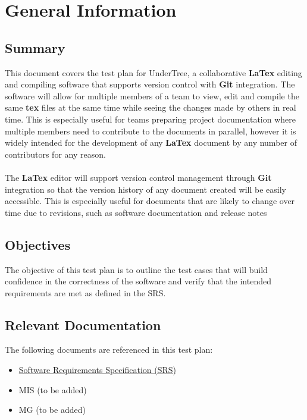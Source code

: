 \documentclass[12pt, titlepage]{article}
\begin{document}
	\section{General Information}
	
	\subsection{Summary}
	
	This document covers the test plan for UnderTree, a collaborative \textbf{LaTex} editing and compiling software that supports version control with\textbf{ Git }integration. The software will allow for multiple members of a team to view, edit and compile the same \textbf{tex} files at the same time while seeing the changes made by others in real time. This is especially useful for teams preparing project documentation where multiple members need to contribute to the documents in parallel, however it is widely intended for the development of any \textbf{LaTex} document by any number of contributors for any reason.\\
	\\The \textbf{LaTex} editor will support version control management through\textbf{ Git }integration so that the version history of any document created will be easily accessible. This is especially useful for documents that are likely to change over time due to revisions, such as software documentation and release notes
	
	\subsection{Objectives}
	
	The objective of this test plan is to outline the test cases that will build confidence in the correctness of the software and verify that the intended requirements are met as defined in the SRS.
	
	\subsection{Relevant Documentation}
	
	The following documents are referenced in this test plan:\
	\begin{itemize}
		\item \href{https://github.com/RutheniumVI/UnderTree/blob/main/docs/SRS/SRS.pdf}{Software Requirements Specification (SRS)}
		\item MIS (to be added)
		\item MG (to be added)
	\end{itemize}
	
\end{document}
